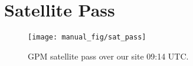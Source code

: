 \documentclass[12pt,a4paper]{article} %
\begin{document}



\section{Satellite Pass}

\begin{figure}[H]
\centering
\texttt{[image: manual\_fig/sat\_pass]}
\caption{GPM satellite pass over our site 09:14 UTC.}
\end{figure}



\end{document}
